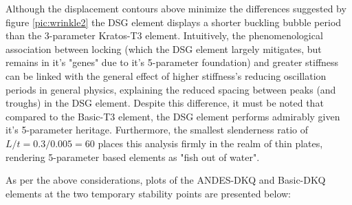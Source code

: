 Although the displacement contours above minimize the differences suggested by figure \ref{pic:wrinkle2} the DSG element displays a shorter buckling bubble period than the 3-parameter Kratos-T3 element. Intuitively, the phenomenological association between locking (which the DSG element largely mitigates, but remains in it's "genes" due to it's 5-parameter foundation) and greater stiffness can be linked with the general effect of higher stiffness's reducing oscillation periods in general physics, explaining the reduced spacing between peaks (and troughs) in the DSG element. Despite this difference, it must be noted that compared to the Basic-T3 element, the DSG element performs admirably given it's 5-parameter heritage. Furthermore, the smallest slenderness ratio of $L/t = 0.3/0.005 = 60$ places this analysis firmly in the realm of thin plates, rendering 5-parameter based elements as "fish out of water".

As per the above considerations, plots of the ANDES-DKQ and Basic-DKQ elements at the two temporary stability points are presented below:

